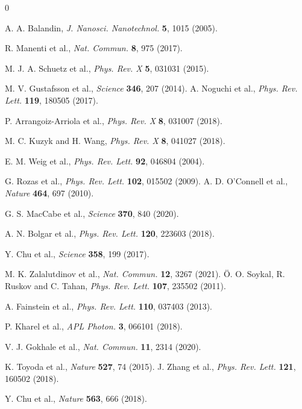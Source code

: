 \documentclass{ws-ijmpb}
\begin{document}
\begin{thebibliography}{0}
	
	A. A. Balandin, {\it J. Nanosci. Nanotechnol.} {\bf5}, 1015 (2005).
	
	R. Manenti et al., {\it Nat. Commun.} {\bf8}, 975 (2017).
	
	M. J. A. Schuetz et al., {\it Phys. Rev. X} {\bf5}, 031031 (2015).
	
	M. V. Gustafsson et al., {\it Science} {\bf346}, 207 (2014).
	A. Noguchi et al., {\it Phys. Rev. Lett.} {\bf119}, 180505 (2017).
	
	P. Arrangoiz-Arriola et al., {\it Phys. Rev. X} {\bf8}, 031007 (2018).
	
	M. C. Kuzyk and H. Wang, {\it Phys. Rev. X} {\bf8}, 041027 (2018).
	
	E. M. Weig et al., {\it Phys. Rev. Lett.} {\bf92}, 046804 (2004).
	
	G. Rozas et al., {\it Phys. Rev. Lett.} {\bf102}, 015502 (2009).
	A. D. O'Connell et al., {\it Nature} {\bf464}, 697 (2010).
	
	G. S. MacCabe et al., {\it Science} {\bf370}, 840 (2020).
	
	A. N. Bolgar et al., {\it Phys. Rev. Lett.} {\bf120}, 223603 (2018).
	
	Y. Chu et al., {\it Science} {\bf358}, 199 (2017).
	
	M. K. Zalalutdinov et al., {\it Nat. Commun.} {\bf12}, 3267 (2021).
	\"O. O. Soykal, R. Ruskov and C. Tahan, {\it Phys. Rev. Lett.} {\bf107}, 235502 (2011).
	
	A. Fainstein et al., {\it Phys. Rev. Lett.} {\bf110}, 037403 (2013).
	
	P. Kharel et al., {\it APL Photon.} {\bf3}, 066101 (2018).
	
	V. J. Gokhale et al., {\it Nat. Commun.} {\bf11}, 2314 (2020).
	
	K. Toyoda et al., {\it Nature} {\bf527}, 74 (2015).
	J. Zhang et al., {\it Phys. Rev. Lett.} {\bf121}, 160502 (2018).
	
	Y. Chu et al., {\it Nature} {\bf563}, 666 (2018).
	

\end{thebibliography}
\end{document}
